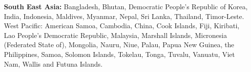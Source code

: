 \textbf{South East Asia:} Bangladesh, Bhutan, Democratic People’s Republic of Korea, India, Indonesia, Maldives, Myanmar, Nepal, Sri Lanka, Thailand, Timor-Leste.
West Pacific: American Samoa, Cambodia, China, Cook Islands, Fiji, Kiribati, Lao People’s Democratic Republic, Malaysia, Marshall Islands, Micronesia (Federated State of), Mongolia, Nauru, Niue, Palau, Papua New Guinea, the Philippines, Samoa, Solomon Islands, Tokelau, Tonga, Tuvalu, Vanuatu, Viet Nam, Wallis and Futuna Islands. 
